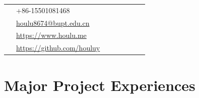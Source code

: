 \documentclass[10pt]{article} %
\begin{document}
\begin{paracol}{2}
\parbox[top][0.12\textheight][c]{\linewidth}{ %
	\vspace{-0.04\textheight} %
	\colorbox{shade}{ %
		\begin{supertabular}{p{0.05\linewidth}|p{0.775\linewidth}} %
			\raisebox{-1pt}{\faPhone} & +86-15501081468 \\ %
			\raisebox{0pt}{\small\faEnvelope} & \href{mailto:houlu8674@bupt.edu.cn}{houlu8674@bupt.edu.cn} \\ %
			\raisebox{-1pt}{\small\faDesktop} & \href{https://www.houlu.me}{https://www.houlu.me} \\ %
			\raisebox{-1pt}{\faGithub} & \href{https://github.com/houluy}{https://github.com/houluy} \\ %
		\end{supertabular}
	}
}

\section{Major Project Experiences}







\end{paracol}
\end{document}
